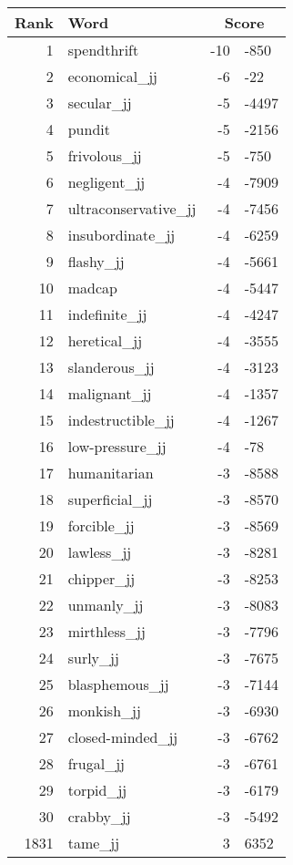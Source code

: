 \begin{longtable}[!htbp]{| rlr@{.}l |}
    \hline
    \textbf{Rank} & \textbf{Word} & \multicolumn{2}{c|}{\textbf{Score}} \\
    \hline
    \endhead
    1 & spendthrift & -10 & -850 \\
    2 & economical\_jj & -6 & -22 \\
    3 & secular\_jj & -5 & -4497 \\
    4 & pundit & -5 & -2156 \\
    5 & frivolous\_jj & -5 & -750 \\
    6 & negligent\_jj & -4 & -7909 \\
    7 & ultraconservative\_jj & -4 & -7456 \\
    8 & insubordinate\_jj & -4 & -6259 \\
    9 & flashy\_jj & -4 & -5661 \\
    10 & madcap & -4 & -5447 \\
    11 & indefinite\_jj & -4 & -4247 \\
    12 & heretical\_jj & -4 & -3555 \\
    13 & slanderous\_jj & -4 & -3123 \\
    14 & malignant\_jj & -4 & -1357 \\
    15 & indestructible\_jj & -4 & -1267 \\
    16 & low-pressure\_jj & -4 & -78 \\
    17 & humanitarian & -3 & -8588 \\
    18 & superficial\_jj & -3 & -8570 \\
    19 & forcible\_jj & -3 & -8569 \\
    20 & lawless\_jj & -3 & -8281 \\
    21 & chipper\_jj & -3 & -8253 \\
    22 & unmanly\_jj & -3 & -8083 \\
    23 & mirthless\_jj & -3 & -7796 \\
    24 & surly\_jj & -3 & -7675 \\
    25 & blasphemous\_jj & -3 & -7144 \\
    26 & monkish\_jj & -3 & -6930 \\
    27 & closed-minded\_jj & -3 & -6762 \\
    28 & frugal\_jj & -3 & -6761 \\
    29 & torpid\_jj & -3 & -6179 \\
    30 & crabby\_jj & -3 & -5492 \\
    1831 & tame\_jj & 3 & 6352 \\

\end{longtable}
